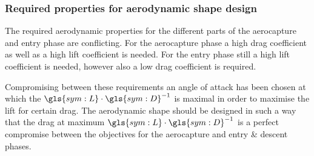 \subsubsection{Required properties for aerodynamic shape design} \label{sec:trajectory_summary}
The required aerodynamic properties for the different parts of the aerocapture and entry phase are conflicting. For the aerocapture phase a high drag coefficient as well as a high lift coefficient is needed. For the entry phase still a high lift coefficient is needed, however also a low drag coefficient is required.

Compromising between these requirements an angle of attack has been chosen at which the $\gls{sym:L}\cdot\gls{sym:D}^{-1}$ is maximal in order to maximise the lift for certain drag. The aerodynamic shape should be designed in such a way that the drag at maximum $\gls{sym:L}\cdot\gls{sym:D}^{-1}$ is a perfect compromise between the objectives for the aerocapture and entry \& descent phases.
